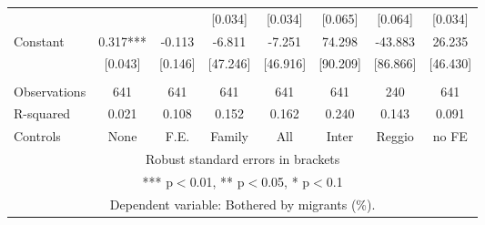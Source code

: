 \begin{tabular}{lccccccc}
 &  &  & [0.034] & [0.034] & [0.065] & [0.064] & [0.034] \\
Constant & 0.317*** & -0.113 & -6.811 & -7.251 & 74.298 & -43.883 & 26.235 \\
 & [0.043] & [0.146] & [47.246] & [46.916] & [90.209] & [86.866] & [46.430] \\
 &  &  &  &  &  &  &  \\
Observations & 641 & 641 & 641 & 641 & 641 & 240 & 641 \\
R-squared & 0.021 & 0.108 & 0.152 & 0.162 & 0.240 & 0.143 & 0.091 \\
 Controls & None & F.E. & Family & All & Inter & Reggio & no FE \\ \hline
\multicolumn{8}{c}{ Robust standard errors in brackets} \\
\multicolumn{8}{c}{ *** p$<$0.01, ** p$<$0.05, * p$<$0.1} \\
\multicolumn{8}{c}{ Dependent variable: Bothered by migrants (\%).} \\
\end{tabular}
